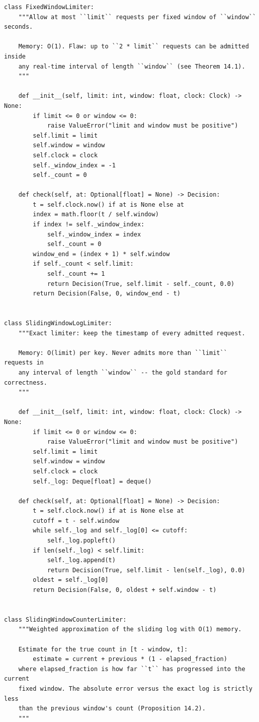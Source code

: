 \begin{verbatim}
class FixedWindowLimiter:
    """Allow at most ``limit`` requests per fixed window of ``window`` seconds.

    Memory: O(1). Flaw: up to ``2 * limit`` requests can be admitted inside
    any real-time interval of length ``window`` (see Theorem 14.1).
    """

    def __init__(self, limit: int, window: float, clock: Clock) -> None:
        if limit <= 0 or window <= 0:
            raise ValueError("limit and window must be positive")
        self.limit = limit
        self.window = window
        self.clock = clock
        self._window_index = -1
        self._count = 0

    def check(self, at: Optional[float] = None) -> Decision:
        t = self.clock.now() if at is None else at
        index = math.floor(t / self.window)
        if index != self._window_index:
            self._window_index = index
            self._count = 0
        window_end = (index + 1) * self.window
        if self._count < self.limit:
            self._count += 1
            return Decision(True, self.limit - self._count, 0.0)
        return Decision(False, 0, window_end - t)


class SlidingWindowLogLimiter:
    """Exact limiter: keep the timestamp of every admitted request.

    Memory: O(limit) per key. Never admits more than ``limit`` requests in
    any interval of length ``window`` -- the gold standard for correctness.
    """

    def __init__(self, limit: int, window: float, clock: Clock) -> None:
        if limit <= 0 or window <= 0:
            raise ValueError("limit and window must be positive")
        self.limit = limit
        self.window = window
        self.clock = clock
        self._log: Deque[float] = deque()

    def check(self, at: Optional[float] = None) -> Decision:
        t = self.clock.now() if at is None else at
        cutoff = t - self.window
        while self._log and self._log[0] <= cutoff:
            self._log.popleft()
        if len(self._log) < self.limit:
            self._log.append(t)
            return Decision(True, self.limit - len(self._log), 0.0)
        oldest = self._log[0]
        return Decision(False, 0, oldest + self.window - t)


class SlidingWindowCounterLimiter:
    """Weighted approximation of the sliding log with O(1) memory.

    Estimate for the true count in [t - window, t]:
        estimate = current + previous * (1 - elapsed_fraction)
    where elapsed_fraction is how far ``t`` has progressed into the current
    fixed window. The absolute error versus the exact log is strictly less
    than the previous window's count (Proposition 14.2).
    """


\end{verbatim}
